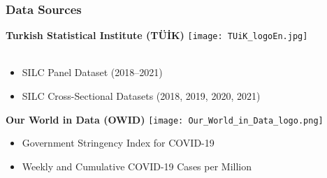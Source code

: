 \documentclass[
	11pt, %
]{beamer}
\begin{document}
\begin{frame}

    \frametitle{Data Sources}
    \textbf{Turkish Statistical Institute (TÜİK)}
    \hfill \texttt{[image: TUiK\_logoEn.jpg]}\\\\
    \begin{itemize}
        \item SILC Panel Dataset (2018--2021) 
        \item SILC Cross-Sectional Datasets (2018, 2019, 2020, 2021)
    \end{itemize}    
    \vspace{0.6cm}
    \textbf{Our World in Data (OWID)}
    \hfill \texttt{[image: Our\_World\_in\_Data\_logo.png]}\\
    \begin{itemize}
        \item Government Stringency Index for COVID-19
        \item Weekly and Cumulative COVID-19 Cases per Million
    \end{itemize}
\end{frame}
\end{document}
